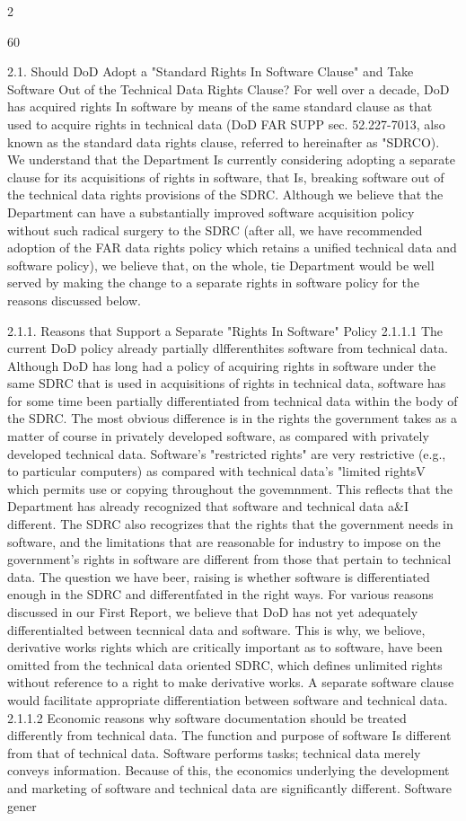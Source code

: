 \documentclass[12pt]{article}
\begin{document}
2

60

2.1. Should DoD Adopt a "Standard Rights In Software Clause" and
Take Software Out of the Technical Data Rights Clause?
For well over a decade, DoD has acquired rights In software by means of the same standard clause
as that used to acquire rights in technical data (DoD FAR SUPP sec. 52.227-7013, also known as the
standard data rights clause, referred to hereinafter as "SDRCO). We understand that the Department
Is currently considering adopting a separate clause for its acquisitions of rights in software, that Is,
breaking software out of the technical data rights provisions of the SDRC. Although we believe that
the Department can have a substantially improved software acquisition policy without such radical
surgery to the SDRC (after all, we have recommended adoption of the FAR data rights policy which
retains a unified technical data and software policy), we believe that, on the whole, tie Department
would be well served by making the change to a separate rights in software policy for the reasons
discussed below.

2.1.1. Reasons that Support a Separate "Rights In Software" Policy
2.1.1.1 The current DoD policy already partially dlfferenthites software from technical data.
Although DoD has long had a policy of acquiring rights in software under the same SDRC that is used
in acquisitions of rights in technical data, software has for some time been partially differentiated from
technical data within the body of the SDRC. The most obvious difference is in the rights the government takes as a matter of course in privately developed software, as compared with privately developed technical data. Software's "restricted rights" are very restrictive (e.g., to particular computers)
as compared with technical data's "limited rightsV which permits use or copying throughout the govemnment. This reflects that the Department has already recognized that software and technical data
a\&I different. The SDRC also recogrizes that the rights that the government needs in software, and
the limitations that are reasonable for industry to impose on the government's rights in software are
different from those that pertain to technical data.
The question we have beer, raising is whether software is differentiated enough in the SDRC and
differentfated in the right ways. For various reasons discussed in our First Report, we believe that
DoD has not yet adequately differentialted between tecnnical data and software. This is why, we
beliove, derivative works rights which are critically important as to software, have been omitted from
the technical data oriented SDRC, which defines unlimited rights without reference to a right to make
derivative works. A separate software clause would facilitate appropriate differentiation between
software and technical data.
2.1.1.2 Economic reasons why software documentation should be treated differently from
technical data.
The function and purpose of software Is different from that of technical data. Software performs
tasks; technical data merely conveys information. Because of this, the economics underlying the
development and marketing of software and technical data are significantly different. Software gener
\end{document}
